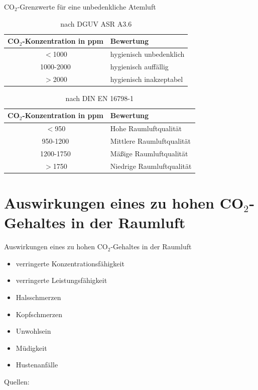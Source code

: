 \documentclass[10pt,ngerman]{beamer}
\begin{document}
\begin{frame}[fragile]{CO$_2$-Grenzwerte für eine unbedenkliche Atemluft}
  \begin{table}
    \begin{tabular}{ |c|p{}|}
      \hline
      CO$_2$-Konzentration in ppm & Bewertung               \\ \hline
      $<$1000                     & hygienisch unbedenklich \\ \hline
      1000-2000                   & hygienisch auffällig    \\ \hline
      $>$2000                     & hygienisch inakzeptabel \\ \hline
    \end{tabular}
    \caption{nach DGUV ASR A3.6 \autocite{ASR}}
  \end{table}
  \begin{table}
    \begin{tabular}{|c|p{}|}
      \hline
      CO$_2$-Konzentration in ppm & Bewertung                 \\ \hline
      $<$950                      & Hohe Raumluftqualität     \\ \hline
      950-1200                    & Mittlere Raumluftqualität \\ \hline
      1200-1750                   & Mäßige Raumluftqualität   \\ \hline
      $>$1750                     & Niedrige Raumluftqualität \\ \hline
    \end{tabular}
    \caption{nach DIN EN 16798-1 \autocite{din_en_16798}}
  \end{table}
\end{frame}

\section{Auswirkungen eines zu hohen CO$_2$-Gehaltes in der Raumluft}
\begin{frame}[fragile]{Auswirkungen eines zu hohen CO$_2$-Gehaltes in der Raumluft}
  \begin{itemize}
    \item verringerte Konzentrationsfähigkeit
    \item verringerte Leistungsfähigkeit
    \item Halsschmerzen
    \item Kopfschmerzen
    \item Unwohlsein
    \item Müdigkeit
    \item Hustenanfälle
  \end{itemize}

  Quellen: \autocite{umweltbundesamt} \autocite{din_en_16798} \autocite{ASR} \autocite{kajtar} \autocite{zhang} \autocite{myhrvold} \autocite{tiesler}
\end{frame}
\end{document}
